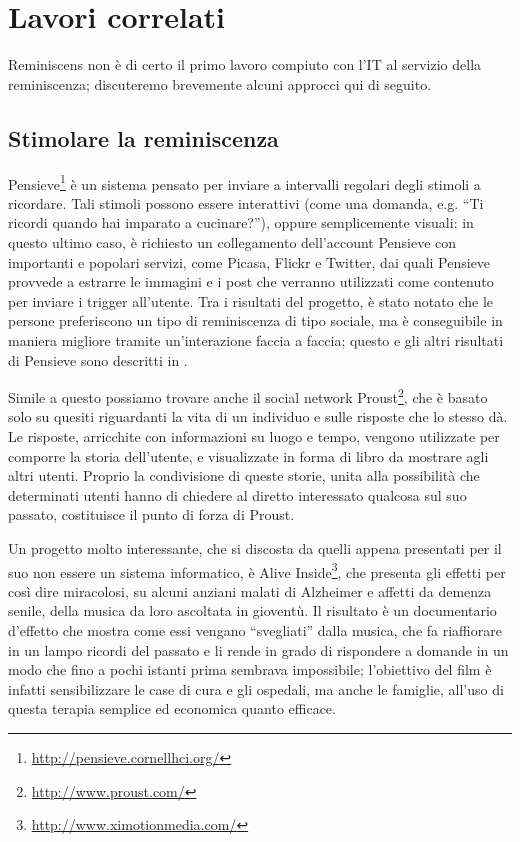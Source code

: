 \documentclass[sigproc-sp.tex]{subfiles}
\begin{document}
\section{Lavori correlati}
Reminiscens non è di certo il primo lavoro compiuto con l’IT al servizio della reminiscenza; discuteremo brevemente alcuni approcci qui di seguito.

\subsection{Stimolare la reminiscenza}
\label{subsec:stimuli}
Pensieve\footnote{\url{http://pensieve.cornellhci.org/}} è un sistema pensato per inviare a intervalli regolari degli stimoli a ricordare. Tali stimoli possono essere interattivi (come una domanda, e.g. “Ti ricordi quando hai imparato a cucinare?”), oppure semplicemente visuali: in questo ultimo caso, è richiesto un collegamento dell’account Pensieve con importanti e popolari servizi, come Picasa, Flickr e Twitter, dai quali Pensieve provvede a estrarre le immagini e i post che verranno utilizzati come contenuto per inviare i trigger all’utente. Tra i risultati del progetto, è stato notato che le persone preferiscono un tipo di reminiscenza di tipo sociale, ma è conseguibile in maniera migliore tramite un'interazione faccia a faccia; questo e gli altri risultati di Pensieve sono descritti in \cite{cosley2012experiences}.

Simile a questo possiamo trovare anche il social network Proust\footnote{\url{http://www.proust.com/}}, che è basato solo su quesiti riguardanti la vita di un individuo e sulle risposte che lo stesso dà. Le risposte, arricchite con informazioni su luogo e tempo, vengono utilizzate per comporre la storia dell’utente, e visualizzate in forma di libro da mostrare agli altri utenti. Proprio la condivisione di queste storie, unita alla possibilità che determinati utenti hanno di chiedere al diretto interessato qualcosa sul suo passato, costituisce il punto di forza di Proust.

Un progetto molto interessante, che si discosta da quelli appena presentati per il suo non essere un sistema informatico, è Alive Inside\footnote{\url{http://www.ximotionmedia.com/}}, che presenta gli effetti per così dire miracolosi, su alcuni anziani malati di Alzheimer e affetti da demenza senile, della musica da loro ascoltata in gioventù. Il risultato è un documentario d’effetto che mostra come essi vengano “svegliati” dalla musica, che fa riaffiorare in un lampo ricordi del passato e li rende in grado di rispondere a domande in un modo che fino a pochi istanti prima sembrava impossibile; l’obiettivo del film è infatti sensibilizzare le case di cura e gli ospedali, ma anche le famiglie, all’uso di questa terapia semplice ed economica quanto efficace.
\end{document}
